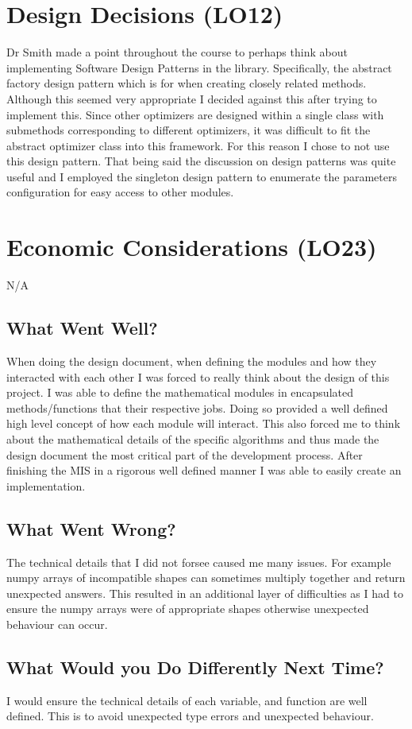 \documentclass{article}
\begin{document}
\section{Design Decisions (LO12)}

Dr Smith made a point throughout the course to perhaps think about implementing Software Design Patterns in the library. Specifically, the abstract factory design pattern which is for when creating closely related methods. Although this seemed very appropriate I decided against this after trying to implement this. Since other optimizers are designed within a single class with submethods corresponding to different optimizers, it was difficult to fit the abstract optimizer class into this framework. For this reason I chose to not use this design pattern. That being said the discussion on design patterns was quite useful and I employed the singleton design pattern to enumerate the parameters configuration for easy access to other modules. 

\section{Economic Considerations (LO23)}

N/A 


\subsection{What Went Well?}

When doing the design document, when defining the modules and how they interacted with each other I was forced to really think about the design of this project. I was able to define the mathematical modules in encapsulated methods/functions that their respective jobs. Doing so provided a well defined high level concept of how each module will interact. This also forced me to think about the mathematical details of the specific algorithms and thus made the design document the most critical part of the development process. After finishing the MIS in a rigorous well defined manner I was able to easily create an implementation.

\subsection{What Went Wrong?}

The technical details that I did not forsee caused me many issues. For example numpy arrays of incompatible shapes can sometimes multiply together and return unexpected answers. This resulted in an additional layer of difficulties as I had to ensure the numpy arrays were of appropriate shapes otherwise unexpected behaviour can occur.

\subsection{What Would you Do Differently Next Time?}

I would ensure the technical details of each variable, and function are well defined. This is to avoid unexpected type errors and unexpected behaviour. 
\end{document}
